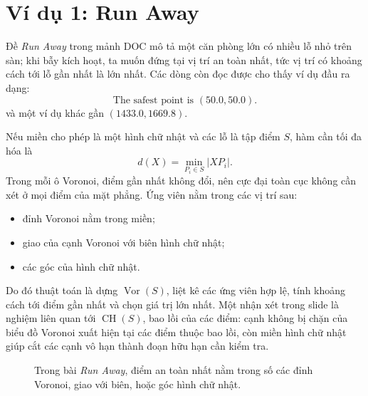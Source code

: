 \documentclass[11pt]{article}
\newcommand{\Vor}{\operatorname{Vor}}
\newcommand{\CH}{\operatorname{CH}}
\begin{document}
\section{Ví dụ 1: Run Away}

Đề \textit{Run Away} trong mảnh DOC mô tả một căn phòng lớn có nhiều lỗ nhỏ
trên sàn; khi bẫy kích hoạt, ta muốn đứng tại vị trí an toàn nhất, tức vị trí
có khoảng cách tới lỗ gần nhất là lớn nhất. Các dòng còn đọc được cho thấy ví
dụ đầu ra dạng:
\[
  \text{The safest point is }(50.0,50.0).
\]
và một ví dụ khác gần \((1433.0,1669.8)\).

Nếu miền cho phép là một hình chữ nhật và các lỗ là tập điểm \(S\), hàm cần
tối đa hóa là
\[
  d(X)=\min_{P_i\in S}|XP_i|.
\]
Trong mỗi ô Voronoi, điểm gần nhất không đổi, nên cực đại toàn cục không cần
xét ở mọi điểm của mặt phẳng. Ứng viên nằm trong các vị trí sau:
\begin{itemize}
  \item đỉnh Voronoi nằm trong miền;
  \item giao của cạnh Voronoi với biên hình chữ nhật;
  \item các góc của hình chữ nhật.
\end{itemize}

Do đó thuật toán là dựng \(\Vor(S)\), liệt kê các ứng viên hợp lệ, tính
khoảng cách tới điểm gần nhất và chọn giá trị lớn nhất. Một nhận xét trong
slide là nghiệm liên quan tới \(\CH(S)\), bao lồi của các điểm: cạnh không bị
chặn của biểu đồ Voronoi xuất hiện tại các điểm thuộc bao lồi, còn miền hình
chữ nhật giúp cắt các cạnh vô hạn thành đoạn hữu hạn cần kiểm tra.

\begin{figure}[ht]
\centering
{}
\caption{Trong bài \emph{Run Away}, điểm an toàn nhất nằm trong số các đỉnh Voronoi, giao với biên, hoặc góc hình chữ nhật.}
\end{figure}
\end{document}
